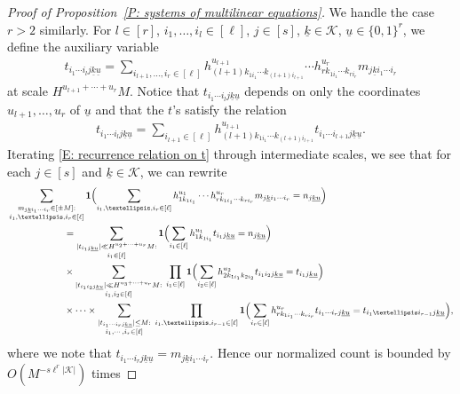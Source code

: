 \documentclass[10pt,a4paper]{amsart}
\newcommand{\Bigbrac}[1]{\Bigl( #1 \Bigr)}
\newcommand{\CK}{{\mathcal K}}
\newcommand{\uk}{{\underline{k}}}
\newcommand{\uu}{{\underline{u}}}
\begin{document}
\begin{proof}[Proof of Proposition~\ref{P: systems of multilinear equations}]
We handle the case $r>2$ similarly. For $l\in[r]$, $i_1, \ldots, i_l\in[\ell]$, $j\in[s]$, $\uk\in\CK$, $\uu\in\{0,1\}^r$, we define the auxiliary variable
\begin{align*}
    t_{i_1\cdots i_l j \uk\uu} =\sum\limits_{i_{l+1}, \ldots, i_r\in[\ell]}h_{(l+1)k_{1i_1} \cdots k_{(l+1)i_{l+1}}}^{u_{l+1}}\cdots h_{r k_{1i_1}\cdots k_{ri_r}}^{u_r}m_{j\uk i_1\cdots i_r}
\end{align*}
at scale $H^{u_{l+1}+\cdots+u_r}M$.
Notice that $t_{i_1\cdots i_l j \uk\uu}$ depends on only the coordinates $u_{l+1}, \ldots, u_r$ of $\uu$ and that the $t$'s satisfy the relation
\begin{align}\label{E: recurrence relation on t}
    t_{i_1\cdots i_l j \uk\uu} = \sum_{i_{l+1}\in[\ell]}h_{(l+1)k_{1i_1} \cdots k_{(l+1)i_{l+1}}}^{u_{l+1}} t_{i_1\cdots i_{l+1} j \uk\uu}.
\end{align}
Iterating \eqref{E: recurrence relation on t} through intermediate scales, we see that {for each $j \in [s]$ and $\uk \in \CK$,} we can rewrite
\begin{align*}
        &\sum_{\substack{m_{j\uk i_1\cdots i_r}\in[\pm M]:\\ 
        i_1, \ldots,  i_r\in[\ell]}} \mathbf{1}\Bigbrac{\sum\limits_{i_1, \ldots, i_r\in[\ell]} h_{1k_{1i_1}}^{u_1} \cdots h_{rk_{1i_1}\cdots k_{ri_r}}^{u_r}m_{j\uk i_1\cdots i_r} = n_{j\uk\uu}} \\
        &\qquad\qquad\qquad=\sum_{\substack{|t_{i_1 j\uk\uu}|\ll H^{u_2+\cdots + u_r}M:\\ i_1\in[\ell]}} \mathbf{1}\Bigbrac{\sum\limits_{i_1\in[\ell]} h_{1k_{1i_1}}^{u_1} t_{i_1 j\uk\uu}= n_{j\uk\uu}}\\ 
    &\qquad\qquad\qquad\times \sum_{\substack{|t_{i_1i_2 j\uk\uu}|\ll H^{u_3+\cdots +u_r}M:\\ i_1, i_2\in[\ell]}}\;\prod_{i_1\in[\ell]} \mathbf{1}\Bigbrac{\sum\limits_{i_2\in[\ell]} h_{2k_{1i_1}k_{2i_2}}^{u_2}t_{i_1 i_2 j\uk\uu} = t_{i_1 j\uk\uu}}\\
    &\qquad\qquad\qquad\times \cdots \times  \sum_{\substack{|t_{i_1\cdots i_r j\uk\uu}|\leq M:\\ i_1, \cdots, i_r\in[\ell]}}\;\prod_{i_1,\ldots, i_{r-1}\in[\ell]} \mathbf{1}\Bigbrac{\sum\limits_{i_r\in[\ell]} h_{rk_{1i_1}\cdots k_{r i_r}}^{u_r}t_{i_1 \cdots i_r j\uk\uu} = t_{i_1 \ldots i_{r-1} j\uk\uu}},
\end{align*}
where we note that $t_{i_1 \cdots i_r j\uk\uu} = m_{j\uk i_1\cdots i_r}$. Hence our normalized count is bounded by $O(M^{-s\ell^r|\CK|})$ times

\end{proof}
\end{document}
